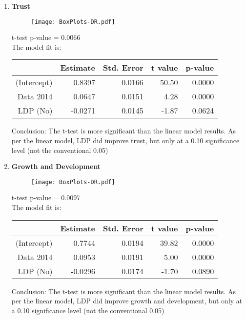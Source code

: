 \documentclass[11pt]{extarticle} %
\begin{document}
\begin{enumerate}
\item {\bf{Trust}}\\
\begin{minipage}[t]{0.3\textwidth}
\begin{figure}[H]
\centering 
\texttt{[image: BoxPlots-DR.pdf]}
\end{figure}
\end{minipage}
\begin{minipage}[t]{0.6\textwidth}
\vspace{0.8cm}
t-test p-value = 0.0066 \\
The model fit is:
\begin{table}[H]
\centering
\begin{tabular}{rrrrr}
  \hline
 & Estimate & Std. Error & t value & p-value \\ 
  \hline
(Intercept) & 0.8397 & 0.0166 & 50.50 & 0.0000 \\ 
  Data 2014 & 0.0647 & 0.0151 & 4.28 & 0.0000 \\ 
  LDP (No) & -0.0271 & 0.0145 & -1.87 & 0.0624 \\ 
   \hline
\end{tabular}
\end{table}
Conclusion: The t-test is more significant than the linear model results. As per the linear model, LDP did improve trust, but only at a 0.10 significance level (not the conventional 0.05)
\end{minipage}

\item {\bf{Growth and Development}}\\
\begin{minipage}[t]{0.3\textwidth}
\begin{figure}[H]
\centering 
\texttt{[image: BoxPlots-DR.pdf]}
\end{figure}
\end{minipage}
\begin{minipage}[t]{0.6\textwidth}
\vspace{0.8cm}
t-test p-value = 0.0097 \\
The model fit is:
\begin{table}[H]
\centering
\begin{tabular}{rrrrr}
  \hline
 & Estimate & Std. Error & t value & p-value \\ 
  \hline
(Intercept) & 0.7744 & 0.0194 & 39.82 & 0.0000 \\ 
  Data 2014 & 0.0953 & 0.0191 & 5.00 & 0.0000 \\ 
  LDP (No) & -0.0296 & 0.0174 & -1.70 & 0.0890 \\ 
   \hline
\end{tabular}
\end{table}
Conclusion: The t-test is more significant than the linear model results. As per the linear model, LDP did improve growth and development, but only at a 0.10 significance level (not the conventional 0.05)
\end{minipage}


\end{enumerate}
\end{document}
